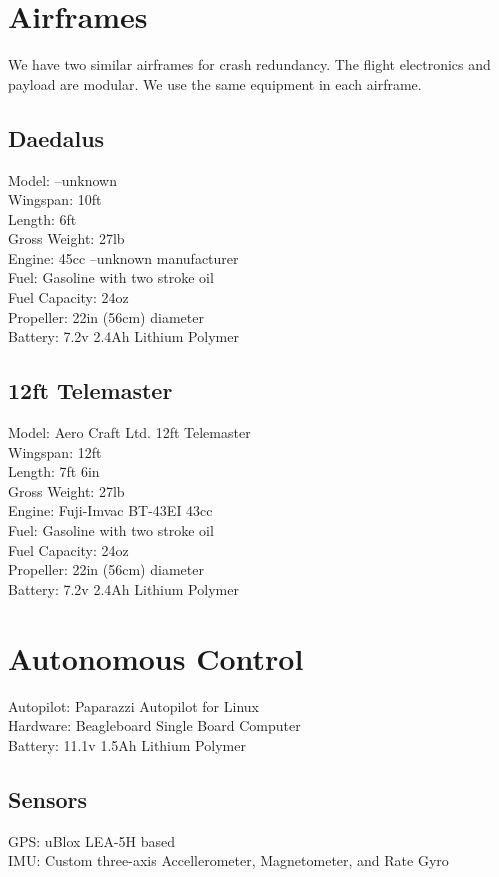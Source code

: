 \documentclass[10pt]{article}
\begin{document}
\begin{multicols}{2}
\section{Airframes}
We have two similar airframes for crash redundancy. The flight electronics and payload are modular. We use the same equipment in each airframe.
\subsection{Daedalus}
Model: --unknown
\\Wingspan: 10ft
\\Length: 6ft
\\Gross Weight: 27lb
\\Engine: 45cc --unknown manufacturer
\\Fuel: Gasoline with two stroke oil
\\Fuel Capacity: 24oz
\\Propeller: 22in (56cm) diameter
\\Battery: 7.2v 2.4Ah Lithium Polymer
\subsection{12ft Telemaster}
Model: Aero Craft Ltd. 12ft Telemaster
\\Wingspan: 12ft
\\Length: 7ft 6in
\\Gross Weight: 27lb
\\Engine: Fuji-Imvac BT-43EI 43cc
\\Fuel: Gasoline with two stroke oil
\\Fuel Capacity: 24oz
\\Propeller: 22in (56cm) diameter
\\Battery: 7.2v 2.4Ah Lithium Polymer

\section{Autonomous Control}
Autopilot: Paparazzi Autopilot for Linux
\\Hardware: Beagleboard Single Board Computer
\\Battery: 11.1v 1.5Ah Lithium Polymer
\subsection{Sensors}
GPS: uBlox LEA-5H based 
\\IMU: Custom three-axis Accellerometer, Magnetometer, and Rate Gyro


\end{multicols}
\end{document}
